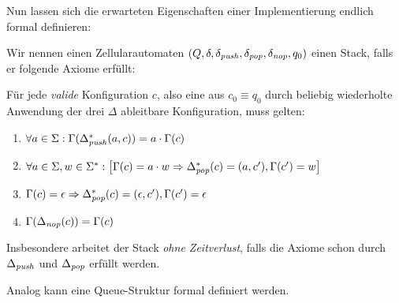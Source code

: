 \documentclass{article}
\begin{document}
Nun lassen sich die erwarteten Eigenschaften einer Implementierung endlich formal definieren:
\begin{definition}
    Wir nennen einen Zellularautomaten $(Q, \delta, \delta_{\mathit{push}}, \delta_{\mathit{pop}}, \delta_{\mathit{nop}}, q_0)$ einen Stack, falls er folgende Axiome erfüllt:

    Für jede \emph{valide} Konfiguration $c$, also eine aus $c_0 \equiv q_0$ durch beliebig wiederholte Anwendung der drei $\Delta$ ableitbare Konfiguration, muss gelten:
    \begin{enumerate}
        \item $\forall a \in \Sigma: \Gamma(\Delta^*_{\mathit{push}}(a,c)) = a \cdot \Gamma(c)$
        \item $\forall a \in \Sigma, w \in \Sigma^*: \left[ \Gamma(c) = a \cdot w \Rightarrow \Delta^*_{\mathit{pop}}(c) = (a,c'), \Gamma(c') = w \right]$
        \item $\Gamma(c) = \epsilon \Rightarrow \Delta^*_{\mathit{pop}}(c) = (\epsilon,c'), \Gamma(c') = \epsilon$
        \item $\Gamma(\Delta_{\mathit{nop}}(c)) = \Gamma(c)$
    \end{enumerate}
    Insbesondere arbeitet der Stack \emph{ohne Zeitverlust}, falls die Axiome schon durch $\Delta_{\mathit{push}}$ und $\Delta_{\mathit{pop}}$ erfüllt werden.
\end{definition}

Analog kann eine Queue-Struktur formal definiert werden.
\end{document}
